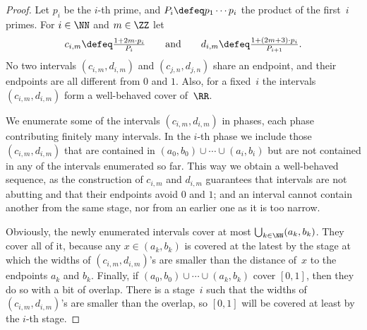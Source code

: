 \begin{proof}
  Let $p_i$ be the $i$-th prime, and $P_i \defeq p_1 \cdots p_i$ the product of the first~$i$ primes.
  For $i \in \NN$ and $m \in \ZZ$ let
  \begin{equation*}
    \textstyle
    c_{i,m} \defeq \frac{1 + 2 m \cdot p_i}{P_i}
    \qquad\text{and}\qquad
    d_{i,m} \defeq \frac{1 + (2 m + 3) \cdot p_i}{P_{i+1}}.
  \end{equation*}
  No two intervals $(c_{i,m}, d_{i,m})$ and $(c_{j,n}, d_{j,n})$ share an endpoint, and their endpoints are all different from $0$ and $1$. Also, for a fixed~$i$ the intervals $(c_{i,m}, d_{i,m})$ form a well-behaved cover of~$\RR$.

  We enumerate some of the intervals $(c_{i,m}, d_{i,m})$ in phases, each phase contributing finitely many intervals. In the $i$-th phase we include those $(c_{i,m}, d_{i,m})$ that are contained in $(a_0, b_0) \cup \cdots \cup (a_i, b_i)$ but are not contained in any of the intervals enumerated so far.
  This way we obtain a well-behaved sequence, as the construction of $c_{i,m}$ and $d_{i,m}$ guarantees that intervals are not abutting and that their endpoints avoid $0$ and $1$; and an interval cannot contain another from the same stage, nor from an earlier one as it is too narrow.

  Obviously, the newly enumerated intervals cover at most $\bigcup_{k \in \NN} (a_k, b_k)$. They cover all of it, because any $x \in (a_k, b_k)$ is covered at the latest by the stage at which the widths of $(c_{i,m}, d_{i,m})$'s are smaller than the distance of~$x$ to the endpoints $a_k$ and $b_k$.
  Finally, if $(a_0, b_0) \cup \cdots \cup (a_k, b_k)$ cover $[0,1]$, then they do so with a bit of overlap. There is a stage~$i$ such that the widths of $(c_{i,m}, d_{i,m})$'s are smaller than the overlap, so $[0,1]$ will be covered at least by the $i$-th stage.
\end{proof}

